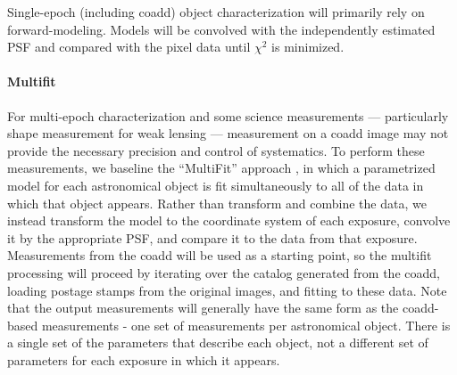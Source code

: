 \documentclass[12pt]{article}
\newcommand{\wbsPSF}{WBS 02C.04.03}
\begin{document}
Single-epoch (including coadd) object characterization will primarily rely on forward-modeling. Models will be convolved with the independently estimated PSF and compared with the pixel data until $\chi^2$ is minimized. %


\paragraph{Multifit}

For multi-epoch characterization and some science measurements --- particularly shape measurement for weak
lensing --- measurement on a coadd image may not provide the necessary
precision and control of systematics.  To perform these measurements,
we baseline the ``MultiFit'' approach \cite{Bosch10, Bosch13}, in which a
parametrized model for each astronomical object is fit simultaneously
to all of the data in which that object appears.  Rather than
transform and combine the data, we instead transform the model to the
coordinate system of each exposure, convolve it by the appropriate
PSF, and compare it to the data from that exposure.  Measurements from
the coadd will be used as a starting point, so the multifit processing
will proceed by iterating over the catalog generated from the coadd,
loading postage stamps from the original images, and fitting to these
data.  Note that the output measurements will generally have the same
form as the coadd-based measurements - one set of measurements per
astronomical object. There is a single set of the
parameters that describe each object, not a different set of parameters
for each exposure in which it appears.
\end{document}
